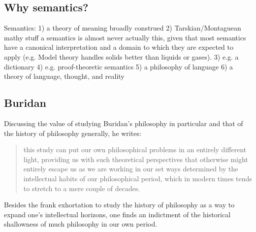 \documentclass[]{article}
\begin{document}
\subsection{Why semantics?}
Semantics: 
1) a theory of meaning broadly construed
2) Tarskian/Montaguean mathy stuff
a semantics is almost never actually this, given that most semantics have a canonical interpretation and a domain to which they are expected to apply (e.g. Model theory handles solids better than liquids or gases).
3) e.g. a dictionary
4) e.g. proof-theoretic semantics
5) a philosophy of language
6) a theory of language, thought, and reality



\subsection{Buridan}
Discussing the value of studying Buridan's philosophy in particular and that of the history of philosophy generally, he writes: 

\begin{quote}
	this study can put our own philosophical problems in an entirely different light, providing us with
	such theoretical perspectives that otherwise might entirely escape us as we are working in our
	set ways determined by the intellectual habits of our philosophical period, which in modern
	times tends to stretch to a mere couple of decades. \autocite[17]{Klima2005}
\end{quote}
Besides the frank exhortation to study the history of philosophy as a way to expand one's intellectual horizons, 
one finds an indictment of the historical shallowness of much philosophy in our own period. 

\end{document}
